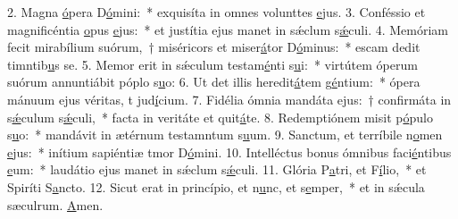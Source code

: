 2. Magna \uline{ó}pera D\uline{ó}mini:~* exquisíta in omnes volunttes \uline{e}jus.
3. Conféssio et magnificéntia \uline{o}pus \uline{e}jus:~* et justítia ejus manet in sǽclum s\uline{ǽ}culi.
4. Memóriam fecit mirabílium suórum,~† miséricors et miser\uline{á}tor D\uline{ó}minus:~* escam dedit timntib\uline{u}s se.
5. Memor erit in sǽculum testam\uline{é}nti s\uline{u}i:~* virtútem óperum suórum annuntiábit póplo s\uline{u}o:
6. Ut det illis heredit\uline{á}tem g\uline{é}ntium:~* ópera mánuum ejus véritas, t jud\uline{í}cium.
7. Fidélia ómnia mandáta ejus:~† confirmáta in s\uline{ǽ}culum s\uline{ǽ}culi,~* facta in veritáte et quit\uline{á}te.
8. Redemptiónem misit p\uline{ó}pulo s\uline{u}o:~* mandávit in ætérnum testamntum s\uline{u}um.
9. Sanctum, et terríbile n\uline{o}men \uline{e}jus:~* inítium sapiéntiæ tmor D\uline{ó}mini.
10. Intelléctus bonus ómnibus faci\uline{é}ntibus \uline{e}um:~* laudátio ejus manet in sǽclum s\uline{ǽ}culi.
11. Glória P\uline{a}tri, et F\uline{í}lio,~* et Spiríti S\uline{a}ncto.
12. Sicut erat in princípio, et n\uline{u}nc, et s\uline{e}mper,~* et in sǽcula sæculrum. \uline{A}men.
